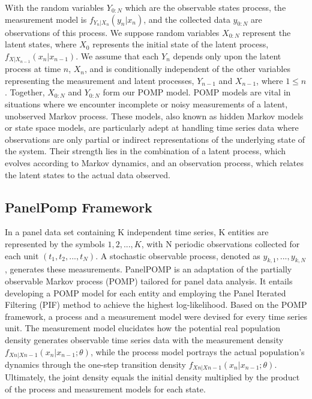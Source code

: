 \documentclass[12pt]{article}
\begin{document}
With the random variables $Y_{0:N}$ which are the observable states process, the measurement model is $f_{Y_n|X_n}(y_n|x_n)$, and the collected data $y_{0:N}$ are observations of this process. We suppose random variables $X_{0:N}$ represent the latent states, where $X_0$ represents the initial state of the latent process, $f_{X|X_{n-1}}(x_n|x_{n-1})$. We assume that each $Y_n$ depends only upon the latent process at time $n$, $X_n$, and is conditionally independent of the other variables representing the measurement and latent processes, $Y_{n-1}$ and $X_{n-1}$, where $1 \leq n$. Together, $X_{0:N}$ and $Y_{0:N}$ form our POMP model. POMP models are vital in situations where we encounter incomplete or noisy measurements of a latent, unobserved Markov process. These models, also known as hidden Markov models or state space models, are particularly adept at handling time series data where observations are only partial or indirect representations of the underlying state of the system. Their strength lies in the combination of a latent process, which evolves according to Markov dynamics, and an observation process, which relates the latent states to the actual data observed.\\


\subsection{PanelPomp Framework}
In a panel data set containing K independent time series, K entities are represented by the symbols $1,2,...,K$, with N periodic observations collected for each unit $(t_1,t_2,...,t_{N})$. A stochastic observable process, denoted as $y_{k,1},...,y_{k,N}$, generates these measurements. PanelPOMP is an adaptation of the partially observable Markov process (POMP) tailored for panel data analysis. It entails developing a POMP model for each entity and employing the Panel Iterated Filtering (PIF) method to achieve the highest log-likelihood. Based on the POMP framework, a process and a measurement model were devised for every time series unit. The measurement model elucidates how the potential real population density generates observable time series data with the measurement density $f_{Xn|Xn-1}(x_n|x_{n-1};\theta)$, while the process model portrays the actual population's dynamics through the one-step transition density $f_{Xn|Xn-1}(x_n|x_{n-1};\theta)$. Ultimately, the joint density equals the initial density multiplied by the product of the process and measurement models for each state.\\
\end{document}
